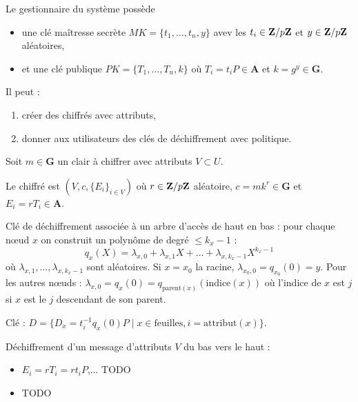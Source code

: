 	Le gestionnaire du système possède
	\begin{itemize}
		\item[\textbullet] une clé maîtresse secrète $MK = \{ t_1, \ldots, t_n, y \}$ avev les $t_i \in \mathbf{Z} / p\mathbf{Z}$ et $y \in \mathbf{Z} / p\mathbf{Z}$ aléatoires,
		\item[\textbullet] et une clé publique $PK = \{ T_1, \ldots, T_n, k \}$ où $T_i = t_i P \in \mathbf{A}$ et $k = g^y \in \mathbf{G}$.
	\end{itemize}
	Il peut :
	\begin{enumerate}[1.]
		\item créer des chiffrés avec attributs,
		\item donner aux utilisateurs des clés de déchiffrement avec politique.
	\end{enumerate}
	
	Soit $m \in \mathbf{G}$ un clair à chiffrer avec attributs $V \subset U$.
	
	Le chiffré est $(V, c, \{ E_i \}_{i \in V})$ où $r \in \mathbf{Z} / p\mathbf{Z}$ aléatoire, $c = m k^r \in \mathbf{G}$ et $E_i = r T_i \in \mathbf{A}$.
	
	Clé de déchiffrement associée à un arbre d'accès de haut en bas : pour chaque nœud $x$ on construit un polynôme de degré $\leq k_x - 1$ :
	$$q_x(X) = \lambda_{x,0} + \lambda_{x,1} X + \ldots + \lambda_{x,k_x - 1} X^{k_x - 1}$$
	où $\lambda_{x,1},\ldots,\lambda_{x,k_x - 1}$ sont aléatoires.
	Si $x = x_0$ la racine, $\lambda_{x_0,0} = q_{x_0}(0) = y$.
	Pour les autres nœuds : $\lambda_{x,0} = q_x(0) = q_{\mathrm{parent}(x)}(\mathrm{indice}(x))$ où l'indice de $x$ est $j$ si $x$ est le $j$ descendant de son parent.
	
	Clé : $D = \{ D_x = t_i^{-1} q_x(0) P \mid x \in \text{feuilles}, i = \mathrm{attribut}(x) \}$.
	
	
	Déchiffrement d'un message d'attributs $V$ du bas vers le haut :
	\begin{itemize}
		\item[\textbullet] $E_i = r T_i = r t_i P$,... TODO
		\item[\textbullet] TODO
	\end{itemize}